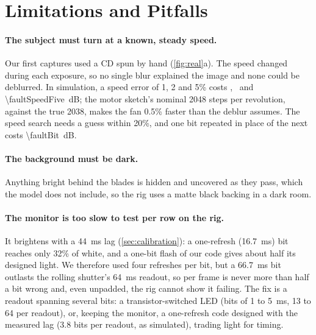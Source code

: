 \section{Limitations and Pitfalls}
\label{sec:limitations}

\paragraph{The subject must turn at a known, steady speed.}
Our first captures used a CD spun by hand (\cref{fig:real}a). The speed changed during each
exposure, so no single blur explained the image and none could be deblurred. In simulation, a speed error of 1, 2 and 5\% costs \faultSpeedOne, \faultSpeedTwo~and \SI{\faultSpeedFive}{dB};
the motor sketch's nominal 2048 steps per revolution, against the true 2038, makes the fan 0.5\% faster than the deblur assumes. The speed search needs a guess within 20\%, and one bit repeated in place of the next costs \SI{\faultBit}{dB}.

\paragraph{The background must be dark.}
Anything bright behind the blades is hidden and uncovered as they pass, which the model does not
include, so the rig uses a matte black backing in a dark room.

\paragraph{The monitor is too slow to test per row on the rig.}
It brightens with a \SI{44}{ms} lag (\cref{sec:calibration}): a one-refresh (\SI{16.7}{ms}) bit reaches only 32\% of white, and a one-bit flash of our code gives about half its designed light. We therefore used four refreshes per bit, but a \SI{66.7}{ms} bit outlasts the rolling shutter's \SI{64}{ms} readout, so per frame is never more than half a bit wrong and, even unpadded, the rig cannot show it failing. The fix is a readout spanning several bits: a transistor-switched LED (bits of 1 to \SI{5}{ms}, 13 to 64 per readout), or, keeping the monitor, a one-refresh code designed with the measured lag (3.8 bits per readout, as simulated), trading light for timing.

